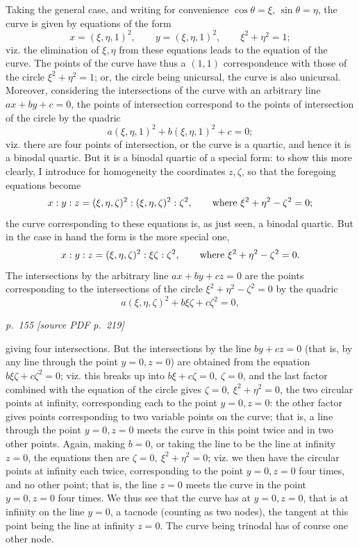 \documentclass[11pt,a4paper]{article}
\newcommand{\sourcepage}[2]{%
  \bigskip
  \noindent\textit{p.~#1 [source PDF p.~#2]}%
  \par\smallskip
}
\begin{document}
Taking the general case, and writing for convenience \(\cos\theta=\xi\),
\(\sin\theta=\eta\), the curve is given by equations of the form
\[
x=(\xi,\eta,1)^2,\qquad y=(\xi,\eta,1)^2,\qquad \xi^2+\eta^2=1;
\]
viz. the elimination of \(\xi,\eta\) from these equations leads to the equation of
the curve. The points of the curve have thus a \((1,1)\) correspondence with those
of the circle \(\xi^2+\eta^2=1\); or, the circle being unicursal, the curve is also
unicursal. Moreover, considering the intersections of the curve with an arbitrary
line \(ax+by+c=0\), the points of intersection correspond to the points of
intersection of the circle by the quadric
\[
a(\xi,\eta,1)^2+b(\xi,\eta,1)^2+c=0;
\]
viz. there are four points of intersection, or the curve is a quartic, and hence it is
a binodal quartic. But it is a binodal quartic of a special form: to show this more
clearly, I introduce for homogeneity the coordinates \(z,\zeta\), so that the foregoing
equations become
\[
x:y:z=(\xi,\eta,\zeta)^2:(\xi,\eta,\zeta)^2:\zeta^2,
\qquad \hbox{where }\xi^2+\eta^2-\zeta^2=0;
\]
the curve corresponding to these equations is, as just seen, a binodal quartic. But in
the case in hand the form is the more special one,
\[
x:y:z=(\xi,\eta,\zeta)^2:\xi\zeta:\zeta^2,
\qquad \hbox{where }\xi^2+\eta^2-\zeta^2=0.
\]
The intersections by the arbitrary line \(ax+by+cz=0\) are the points corresponding
to the intersections of the circle \(\xi^2+\eta^2-\zeta^2=0\) by the quadric
\[
a(\xi,\eta,\zeta)^2+b\xi\zeta+c\zeta^2=0,
\]

\sourcepage{155}{219}

giving four intersections. But the intersections by the line \(by+cz=0\) (that is,
by any line through the point \(y=0,z=0\)) are obtained from the equation
\(b\xi\zeta+c\zeta^2=0\); viz. this breaks up into \(b\xi+c\zeta=0,\ \zeta=0\),
and the last factor combined with the equation of the circle gives
\(\zeta=0,\ \xi^2+\eta^2=0\), the two circular points at infinity, corresponding each
to the point \(y=0,z=0\): the other factor gives points corresponding to two variable
points on the curve; that is, a line through the point \(y=0,z=0\) meets the curve
in this point twice and in two other points. Again, making \(b=0\), or taking the line
to be the line at infinity \(z=0\), the equations then are \(\zeta=0,\ \xi^2+\eta^2=0\);
viz. we then have the circular points at infinity each twice, corresponding to the point
\(y=0,z=0\) four times, and no other point; that is, the line \(z=0\) meets the curve
in the point \(y=0,z=0\) four times. We thus see that the curve has at \(y=0,z=0\),
that is at infinity on the line \(y=0\), a tacnode (counting as two nodes), the tangent
at this point being the line at infinity \(z=0\). The curve being trinodal has of
course one other node.
\end{document}
